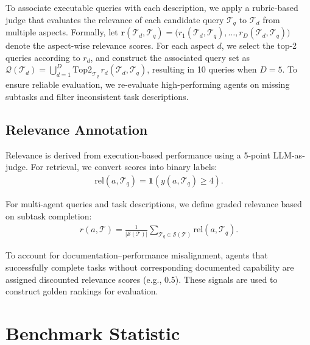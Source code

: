 \documentclass{article} %
\begin{document}
To associate executable queries with each description, we apply a rubric-based judge \citep{sharma2026researchrubrics} that evaluates the relevance of each candidate query $\mathcal{T}_q$ to $\mathcal{T}_d$ from multiple aspects. Formally, let $\mathbf{r}(\mathcal{T}_d,\mathcal{T}_q)=\big(r_1(\mathcal{T}_d,\mathcal{T}_q),\dots,r_D(\mathcal{T}_d,\mathcal{T}_q)\big)$ denote the aspect-wise relevance scores. For each aspect $d$, we select the top-2 queries according to $r_d$, and construct the associated query set as $\mathcal{Q}(\mathcal{T}_d)=\bigcup_{d=1}^{D}\text{Top2}_{\mathcal{T}_q}\, r_d(\mathcal{T}_d,\mathcal{T}_q)$,
resulting in 10 queries when $D=5$. To ensure reliable evaluation, we re-evaluate high-performing agents on missing subtasks and filter inconsistent task descriptions.

\subsection{Relevance Annotation}

Relevance is derived from execution-based performance using a 5-point LLM-as-judge. For retrieval, we convert scores into binary labels:
\begin{align}
\mathrm{rel}(a,\mathcal{T}_q)=\mathbf{1}(y(a,\mathcal{T}_q)\geq 4).
\end{align}

For multi-agent queries and task descriptions, we define graded relevance based on subtask completion:
\begin{align}
r(a,\mathcal{T})=\frac{1}{|\mathcal{S}(\mathcal{T})|}\sum_{\mathcal{T}_q\in\mathcal{S}(\mathcal{T})}\mathrm{rel}(a,\mathcal{T}_q).
\end{align}

To account for documentation–performance misalignment, agents that successfully complete tasks without corresponding documented capability are assigned discounted relevance scores (e.g., 0.5). These signals are used to construct golden rankings for evaluation.

\section{Benchmark Statistic}
\end{document}
